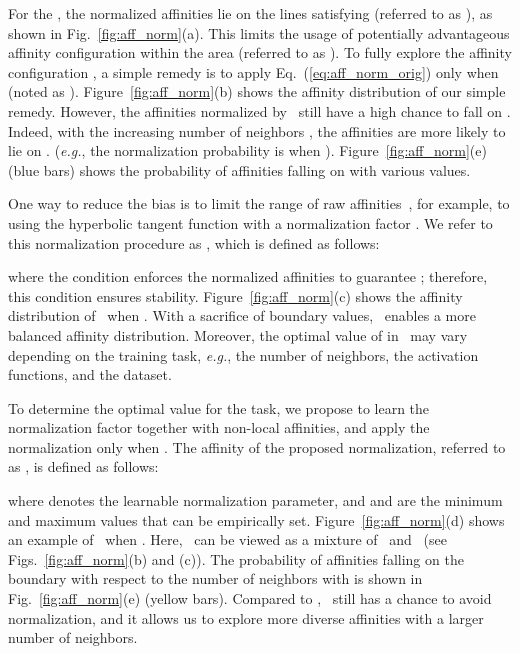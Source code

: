 \documentclass[runningheads]{llncs}
\newcommand{\figref}[1]{Fig.~\ref{#1}}
\newcommand{\figsref}[1]{Figs.~\ref{#1}}
\newcommand{\eqnref}[1]{Eq.~(\ref{#1})}
\newcommand{\Figref}[1]{Figure~\ref{#1}}
\newcommand{\eg}{\textit{e.g.}}
\newcommand{\absSum}{}
\newcommand{\absSumStar}{}
\newcommand{\tanhC}{}
\newcommand{\tgAbsSumStar}{}
\begin{document}
For the \absSum, the normalized affinities lie on the lines satisfying  (referred to as ), as shown in \figref{fig:aff_norm}(a).
This limits the usage of potentially advantageous affinity configuration within the area  (referred to as ). 
To fully explore the affinity configuration , a simple remedy is to apply \eqnref{eq:aff_norm_orig} only when  (noted as \absSumStar). 
\Figref{fig:aff_norm}(b) shows the affinity distribution of our simple remedy. 
However, the affinities normalized by \absSumStar~still have a high chance to fall on . 
Indeed, with the increasing number of neighbors , the affinities are more likely to lie on . (\eg, the normalization probability is  when ).
\Figref{fig:aff_norm}(e) (blue bars) shows the probability of affinities falling on  with various  values.


One way to reduce the bias is to limit the range of raw affinities~\cite{liu2016learning}, for example, to  using the hyperbolic tangent function  with a normalization factor . 
We refer to this normalization procedure as \tanhC, which is defined as follows: 

where the condition  enforces the normalized affinities to guarantee ; therefore, this condition ensures stability. 
\Figref{fig:aff_norm}(c) shows the affinity distribution of \tanhC~when . 
With a sacrifice of boundary values, \tanhC~enables a more balanced affinity distribution. 
Moreover, the optimal value of  in \tanhC~may vary depending on the training task, \eg, the number of neighbors, the activation functions, and the dataset.


To determine the optimal value for the task, we propose to learn the normalization factor together with non-local affinities, and apply the normalization only when . 
The affinity of the proposed normalization, referred to as \tgAbsSumStar, is defined as follows: 

where  denotes the learnable normalization parameter, and  and  are the minimum and maximum values that can be empirically set.
\Figref{fig:aff_norm}(d) shows an example of \tgAbsSumStar~when . 
Here, \tgAbsSumStar~can be viewed as a mixture of \absSumStar~and \tanhC~(see \figsref{fig:aff_norm}(b) and (c)). 
The probability of affinities falling on the boundary with respect to the number of neighbors with  is shown in \figref{fig:aff_norm}(e) (yellow bars). 
Compared to \absSumStar, \tgAbsSumStar~still has a chance to avoid normalization, and it allows us to explore more diverse affinities with a larger number of neighbors.
\end{document}
